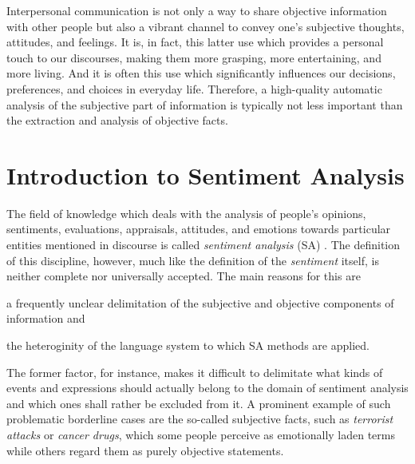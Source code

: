

Interpersonal communication is not only a way to share objective
information with other people but also a vibrant channel to convey
one's subjective thoughts, attitudes, and feelings.  It is, in fact,
this latter use which provides a personal touch to our discourses,
making them more grasping, more entertaining, and more living.  And it
is often this use which significantly influences our decisions,
preferences, and choices in everyday life.  Therefore, a high-quality
automatic analysis of the subjective part of information is typically
not less important than the extraction and analysis of objective
facts.

\section{Introduction to Sentiment Analysis}

The field of knowledge which deals with the analysis of people's
opinions, sentiments, evaluations, appraisals, attitudes, and emotions
towards particular entities mentioned in discourse is called
\emph{sentiment analysis} (SA) \citep{Liu:12}.  The definition of this
discipline, however, much like the definition of the \emph{sentiment}
itself, is neither complete nor universally accepted.  The main
reasons for this are
\begin{inparaenum}
  \item a frequently unclear delimitation of the subjective and
    objective components of information and
  \item the heteroginity of the language system to which SA methods
    are applied.
\end{inparaenum}

The former factor, for instance, makes it difficult to delimitate what
kinds of events and expressions should actually belong to the domain
of sentiment analysis and which ones shall rather be excluded from it.
A prominent example of such problematic borderline cases are the
so-called subjective facts, such as \emph{terrorist attacks} or
\emph{cancer drugs}, which some people perceive as emotionally laden
terms while others regard them as purely objective statements.

